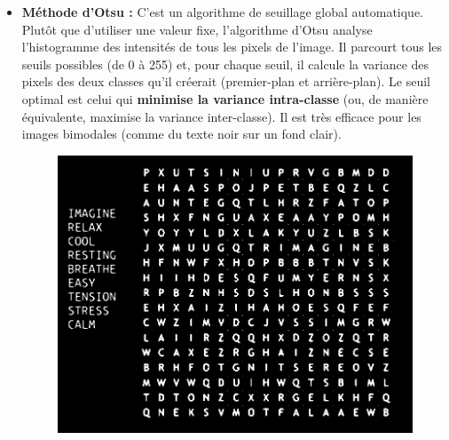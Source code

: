 \documentclass{article}
\begin{document}
  \begin{itemize}
    \item \textbf{Méthode d'Otsu :} C'est un algorithme de seuillage global automatique. Plutôt que d'utiliser une valeur fixe, l'algorithme d'Otsu analyse l'histogramme des intensités de tous les pixels de l'image. Il parcourt tous les seuils possibles (de 0 à 255) et, pour chaque seuil, il calcule la variance des pixels des deux classes qu'il créerait (premier-plan et arrière-plan). Le seuil optimal est celui qui \textbf{minimise la variance intra-classe} (ou, de manière équivalente, maximise la variance inter-classe). Il est très efficace pour les images bimodales (comme du texte noir sur un fond clair).
    \begin{figure}[H]
      \centering
          \includegraphics[width=\linewidth]{ressources/1level_1_image_1_03_otsu_threshold.png}
          \caption{}
        \endminipage\quad\quad\quad\quad

\end{figure}
\end{itemize}
\end{document}
